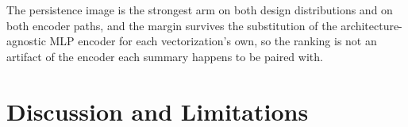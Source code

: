 \documentclass[11pt,letterpaper]{article}
\newcommand{\1}{\mathds{1}}
\theoremstyle{plain}
\theoremstyle{definitioncolon}
\begin{document}
The persistence image is the strongest arm on both design distributions and on
both encoder paths, and the margin survives the substitution of the
architecture-agnostic MLP encoder for each vectorization's own, so the ranking
is not an artifact of the encoder each summary happens to be paired with.


\section{Discussion and Limitations}
\label{sec:discussion}
\end{document}
